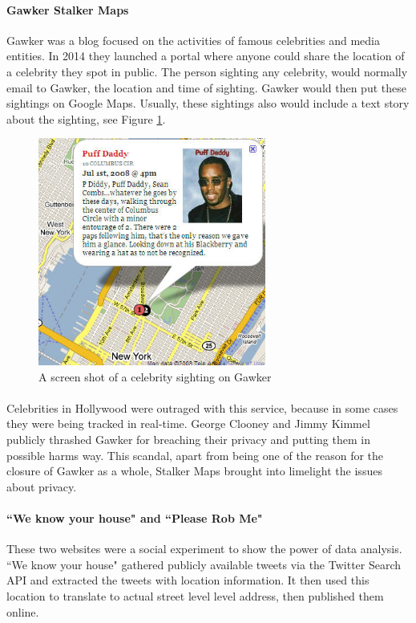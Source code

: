 \documentclass[12pt]{report}
\begin{document}
\paragraph{Gawker Stalker Maps\cite{GawkerURL}} Gawker was a blog focused on the activities of famous celebrities and media entities. In 2014 they launched a portal where anyone could share the location of a celebrity they spot in public. The person sighting any celebrity, would normally email to Gawker, the location and time of sighting. Gawker would then put these sightings on Google Maps. Usually, these sightings also would include a text story about the sighting, see Figure \ref{fig:Gawker}. 

\begin{figure}[ht]
\centering
        \includegraphics[width=75mm,scale=0.5]{Images/gawker-stalker.jpg}
    \caption{A screen shot of a celebrity sighting on Gawker}
    \label{fig:Gawker}
\end{figure}
\paragraph{}
Celebrities in Hollywood were outraged with this service, because in some cases they were being tracked in real-time. George Clooney and Jimmy Kimmel publicly thrashed Gawker for breaching their privacy and putting them in possible harms way. This scandal, apart from being one of the reason for the closure of Gawker as a whole, Stalker Maps brought into limelight the issues about privacy.
\paragraph{``We know your house"\cite{WeKnowYourHouse} and ``Please Rob Me"\cite{PleaseRobMe}} These two websites were a social experiment to show the power of data analysis. ``We know your house"\cite{WeKnowYourHouse} gathered publicly available tweets via the Twitter Search API\cite{twiterSearchAPI} and extracted the tweets with location information. It then used this location to translate to actual street level level address, then published them online. 
\end{document}
